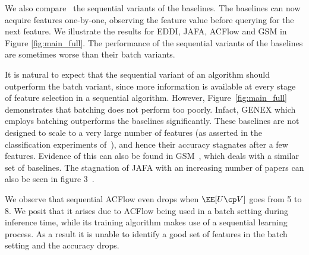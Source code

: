 \documentclass[letterpaper]{article}
\renewcommand{\cite}{\citep}
\begin{document}
We also compare \our\  the sequential variants of the baselines. The baselines can now acquire features one-by-one, observing the feature value before querying for the next feature. We illustrate the results for EDDI, JAFA, ACFlow and GSM in Figure \ref{fig:main_full}. The performance of the sequential variants of the baselines are sometimes worse than their batch variants. 

It is natural to expect that the sequential variant of an algorithm should outperform the batch variant, since more information is available at every stage of feature selection in a sequential algorithm. However, Figure~\ref{fig:main_full} demonstrates that batching does not perform too poorly. Infact, GENEX which employs batching outperforms the baselines significantly.
These baselines are not designed to scale to a very large number of features (as asserted in the classification experiments of~\citet{gsm}), and hence their accuracy stagnates after a few features. Evidence of this can also be found in GSM~\citet[Figs. 6,7]{gsm}, which deals with a similar set of baselines. The stagnation of JAFA with an increasing number of papers can also be seen in figure 3~\cite{jafa}.

We observe that sequential ACFlow even drops  when $\EE[U\cp V]$ goes from 5 to 8.  We posit that it arises due to ACFlow being used in a batch setting during inference time, while its training algorithm makes use of a sequential learning process. As a result it is unable to identify a good set of features in the batch setting and the accuracy drops.



\end{document}
